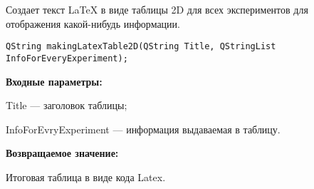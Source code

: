 Создает текст LaTeX в виде таблицы 2D для всех экспериментов для отображения какой-нибудь информации.


\begin{lstlisting}[label=code_syntax_makingLatexTable2D,caption=Синтаксис]
QString makingLatexTable2D(QString Title, QStringList InfoForEveryExperiment);
\end{lstlisting}

\textbf{Входные параметры:}

Title --- заголовок таблицы;

InfoForEvryExperiment --- информация выдаваемая в таблицу.

\textbf{Возвращаемое значение:}

Итоговая таблица в виде кода Latex.


